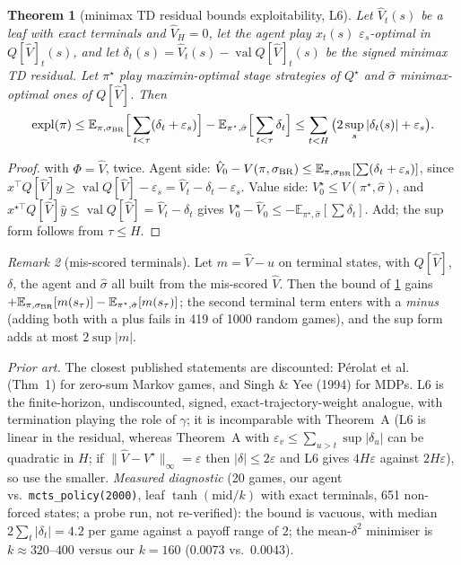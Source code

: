 \documentclass[10pt]{article}
\theoremstyle{plain}
\newtheorem{theorem}{Theorem}
\theoremstyle{definition}
\theoremstyle{remark}
\newtheorem{remark}[theorem]{Remark}
\newcommand{\E}{\mathbb{E}}
\newcommand{\epss}{\varepsilon_s}
\newcommand{\epsv}{\varepsilon_v}
\DeclareMathOperator{\val}{val}
\DeclareMathOperator{\expl}{expl}
\begin{document}
\begin{theorem}[minimax TD residual bounds exploitability, L6]\label{thm:L6}
Let $\hat V_t(s)$ be a leaf with exact terminals and $\hat V_H=0$, let the agent play $x_t(s)$ $\epss$-optimal in $Q[\hat V]_t(s)$, and let $\delta_t(s)=\hat V_t(s)-\val Q[\hat V]_t(s)$ be the signed minimax TD residual. Let $\pi^\star$ play maximin-optimal stage strategies of $Q^\star$ and $\hat\sigma$ minimax-optimal ones of $Q[\hat V]$. Then
\[\expl(\pi)\le\E_{\pi,\sigma_{\rm BR}}\Big[\sum_{t<\tau}(\delta_t+\epss)\Big]-\E_{\pi^\star,\hat\sigma}\Big[\sum_{t<\tau}\delta_t\Big]\le\sum_{t<H}\big(2\sup_s|\delta_t(s)|+\epss\big).\]
\end{theorem}
\begin{proof}
 with $\Phi=\hat V$, twice. Agent side: $\hat V_0-V(\pi,\sigma_{\rm BR})\le\E_{\pi,\sigma_{\rm BR}}[\sum(\delta_t+\epss)]$, since $x^\top Q[\hat V]y\ge\val Q[\hat V]-\epss=\hat V_t-\delta_t-\epss$. Value side: $V^\star_0\le V(\pi^\star,\hat\sigma)$, and $x^{\star\top}Q[\hat V]\hat y\le\val Q[\hat V]=\hat V_t-\delta_t$ gives $V^\star_0-\hat V_0\le-\E_{\pi^\star,\hat\sigma}[\sum\delta_t]$. Add; the sup form follows from $\tau\le H$.
\end{proof}
\begin{remark}[mis-scored terminals]
Let $m=\hat V-u$ on terminal states, with $Q[\hat V]$, $\delta$, the agent and $\hat\sigma$ all built from the mis-scored $\hat V$. Then the bound of \cref{thm:L6} gains $+\E_{\pi,\sigma_{\rm BR}}[m(s_\tau)]-\E_{\pi^\star,\hat\sigma}[m(s_\tau)]$; the second terminal term enters with a \emph{minus} (adding both with a plus fails in 419 of 1000 random games), and the sup form adds at most $2\sup|m|$.
\end{remark}
\emph{Prior art.} The closest published statements are discounted: P\'erolat et al.~\cite{Per16} (Thm~1) for zero-sum Markov games, and Singh \& Yee (1994) for MDPs. L6 is the finite-horizon, undiscounted, signed, exact-trajectory-weight analogue, with termination playing the role of $\gamma$; it is incomparable with Theorem~A (L6 is linear in the residual, whereas Theorem~A with $\epsv\le\sum_{u>t}\sup|\delta_u|$ can be quadratic in $H$; if $\lVert\hat V-V^\star\rVert_\infty=\varepsilon$ then $|\delta|\le2\varepsilon$ and L6 gives $4H\varepsilon$ against $2H\varepsilon$), so use the smaller. \emph{Measured diagnostic} (20 games, our agent vs.\ \texttt{mcts\_policy(2000)}, leaf $\tanh(\text{mid}/k)$ with exact terminals, 651 non-forced states; a probe run, not re-verified): the bound is vacuous, with median $2\sum_t|\delta_t|=4.2$ per game against a payoff range of $2$; the mean-$\delta^2$ minimiser is $k\approx320$--$400$ versus our $k=160$ (0.0073 vs.\ 0.0043).
\end{document}
